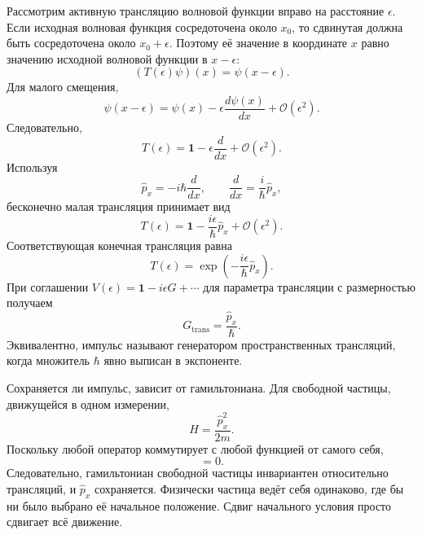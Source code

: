 Рассмотрим активную трансляцию волновой функции вправо на расстояние \(\epsilon\). Если исходная волновая функция сосредоточена около \(x_0\), то сдвинутая должна быть сосредоточена около \(x_0+\epsilon\). Поэтому её значение в координате \(x\) равно значению исходной волновой функции в \(x-\epsilon\):
\begin{equation}
(T(\epsilon)\psi)(x)=\psi(x-\epsilon).
\end{equation}
Для малого смещения,
\begin{equation}
\psi(x-\epsilon)
=
\psi(x)-\epsilon\frac{d\psi(x)}{dx}
+\mathcal O(\epsilon^2).
\end{equation}
Следовательно,
\begin{equation}
T(\epsilon)
=
\mathbf 1-\epsilon\frac{d}{dx}
+\mathcal O(\epsilon^2).
\end{equation}
Используя
\begin{equation}
\hat p_x=-i\hbar\frac{d}{dx},
\qquad
\frac{d}{dx}=\frac{i}{\hbar}\hat p_x,
\end{equation}
бесконечно малая трансляция принимает вид
\begin{equation}
T(\epsilon)
=
\mathbf 1-\frac{i\epsilon}{\hbar}\hat p_x
+\mathcal O(\epsilon^2).
\end{equation}
Соответствующая конечная трансляция равна
\begin{equation}
T(\epsilon)
=
\exp\left(-\frac{i\epsilon}{\hbar}\hat p_x\right).
\end{equation}
При соглашении \(V(\epsilon)=\mathbf 1-i\epsilon G+\cdots\) для параметра трансляции с размерностью получаем
\begin{equation}
G_{\mathrm{trans}}=\frac{\hat p_x}{\hbar}.
\end{equation}
Эквивалентно, импульс называют генератором пространственных трансляций, когда множитель \(\hbar\) явно выписан в экспоненте.

\begin{classroomqa}
\end{classroomqa}

Сохраняется ли импульс, зависит от гамильтониана. Для свободной частицы, движущейся в одном измерении,
\begin{equation}
H=\frac{\hat p_x^2}{2m}.
\end{equation}
Поскольку любой оператор коммутирует с любой функцией от самого себя,
\begin{equation}
[H,\hat p_x]=0.
\end{equation}
Следовательно, гамильтониан свободной частицы инвариантен относительно трансляций, и \(\hat p_x\) сохраняется. Физически частица ведёт себя одинаково, где бы ни было выбрано её начальное положение. Сдвиг начального условия просто сдвигает всё движение.

